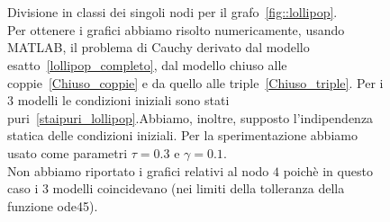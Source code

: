 \begin{figure}[!htb]
	\centering
{}
\\
 \\
\caption[Confronto tra il modello esatto, chiuso alle coppie e alle triple per il grafo~\ref{fig::lollipop}]{Divisione in classi dei singoli nodi per il grafo~\ref{fig::lollipop}. \\
Per ottenere i grafici abbiamo risolto numericamente,  usando MATLAB, il problema di Cauchy derivato dal modello esatto~\eqref{lollipop_completo},  dal modello chiuso alle coppie~\eqref{Chiuso_coppie} e da quello alle triple~\eqref{Chiuso_triple}.
Per i $3$ modelli le condizioni iniziali sono stati puri~\eqref{staipuri_lollipop}.Abbiamo, inoltre,  supposto l'indipendenza statica delle condizioni iniziali.
Per la sperimentazione abbiamo usato come parametri $\tau = 0.3$ e $\gamma = 0.1$.\\
Non abbiamo riportato i grafici relativi al nodo $4$ poich\`e in questo caso i 3 modelli coincidevano (nei limiti della tolleranza della funzione ode45).\\}
\label{fig::confronto_modelli}
\end{figure}

